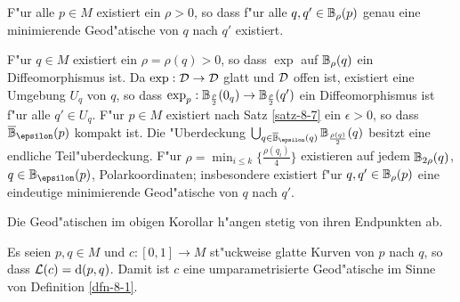 \begin{Kor}\label{kor-8-8}
  F"ur alle $p \in M$ existiert ein $\rho > 0$, so dass f"ur alle $q, q' \in \B_\rho(p)$ genau eine minimierende Geod"atische von $q$ nach $q'$ existiert.
\end{Kor}

\begin{bew}
  F"ur $q \in M$ existiert ein $\rho = \rho(q) > 0$, so dass $\exp$ auf $\B_\rho(q)$ ein Diffeomorphismus ist.
  Da $\exp: \operatorname{\mathcal{D}} \to \operatorname{\mathcal{D}}$ glatt und $\operatorname{\mathcal{D}}$ offen ist, existiert eine Umgebung $U_q$ von $q$, so dass $\exp_p: \B_{\frac{\rho}{2}}(0_q) \to \B_{\frac{\rho}{2}}(q')$ ein Diffeomorphismus ist f"ur alle $q' \in U_q$.
  F"ur $p \in M$ existiert nach Satz \ref{satz-8-7} ein $\epsilon > 0$, so dass $\overline \B_\epsilon(p)$ kompakt ist.
  Die "Uberdeckung $\bigcup_{q \in \overline \B_\epsilon(q)} \B_{\frac{\rho(q)}{2}}(q)$ besitzt eine endliche Teil"uberdeckung.
  F"ur $\rho = \min_{i \le k} \{ \frac{\rho(q_i)}{4} \}$ existieren auf jedem $\B_{2\rho}(q)$, $q \in \B_\epsilon(p)$, Polarkoordinaten; insbesondere existiert f"ur $q, q' \in \B_\rho(p)$ eine eindeutige minimierende Geod"atische von $q$ nach $q'$.
\end{bew}

\begin{bem}
  Die Geod"atischen im obigen Korollar h"angen stetig von ihren Endpunkten ab.
\end{bem}

\begin{Kor}\label{kor-8-9}
  Es seien $p, q \in M$ und $c: [0,1] \to M$ st"uckweise glatte Kurven von $p$ nach $q$, so dass $\operatorname{\mathcal{L}}(c) = \mathrm{d}(p,q)$.
  Damit ist $c$ eine umparametrisierte Geod"atische im Sinne von Definition \ref{dfn-8-1}.
\end{Kor}

